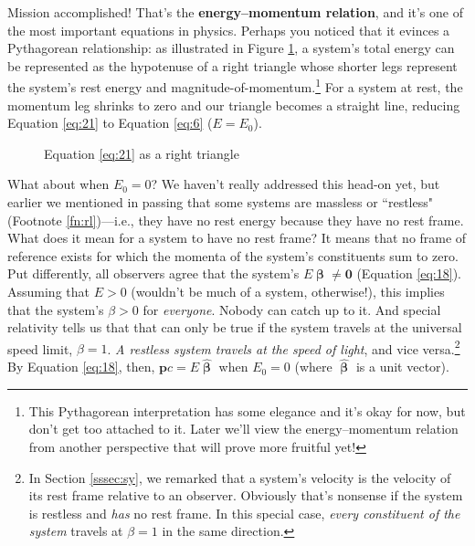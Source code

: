 \documentclass[12pt]{article}
\renewcommand{\vv}[1]{\mathbf{#1}}
\newcommand{\vvbeta}{\bm{\upbeta}}
\newcommand{\hatbeta}{\bm{\hat{\upbeta}}}
\begin{document}
Mission accomplished! That's the \textbf{energy--momentum relation}, and it's one of the most important equations in physics. Perhaps you noticed that it evinces a Pythagorean relationship: as illustrated in Figure \ref{f:1}, a system's total energy can be represented as the hypotenuse of a right triangle whose shorter legs represent the system's rest energy and magnitude-of-momentum.\footnote{This Pythagorean interpretation has some elegance and it's okay for now, but don't get too attached to it. Later we'll view the energy--momentum relation from another perspective that will prove more fruitful yet!} For a system at rest, the momentum leg shrinks to zero and our triangle becomes a straight line, reducing Equation \ref{eq:21} to Equation \ref{eq:6} ($E=E_0$).

\begin{figure}[h]
\centering
\caption{Equation \ref{eq:21} as a right triangle}
\label{f:1}
\vspace{10pt}
\end{figure}

What about when $E_0 = 0$? We haven't really addressed this head-on yet, but earlier we mentioned in passing that some systems are massless or ``restless" (Footnote \ref{fn:rl})---i.e., they have no rest energy because they have no rest frame. What does it mean for a system to have no rest frame? It means that no frame of reference exists for which the momenta of the system's constituents sum to zero. Put differently, all observers agree that the system's $E \vvbeta \neq \vv 0$ (Equation \ref{eq:18}). Assuming that $E > 0$ (wouldn't be much of a system, otherwise!), this implies that the system's $\beta > 0$ for \emph{everyone}. Nobody can catch up to it. And special relativity tells us that that can only be true if the system travels at the universal speed limit, $\beta = 1$. \emph{A restless system travels at the speed of light}, and vice versa.\footnote{In Section \ref{sssec:sy}, we remarked that a system's velocity is the velocity of its rest frame relative to an observer. Obviously that's nonsense if the system is restless and \emph{has} no rest frame. In this special case, \emph{every constituent of the system} travels at $\beta = 1$ in the same direction.} By Equation \ref{eq:18}, then, $\vv p c = E \hatbeta$ when $E_0 = 0$ (where $\hatbeta$ is a unit vector).
\end{document}
